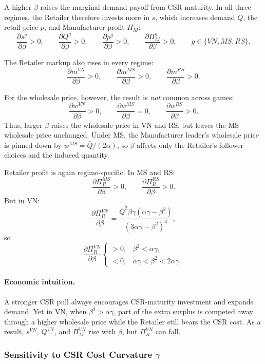 A higher \(\beta\) raises the marginal demand payoff from CSR maturity. In all three regimes,
the Retailer therefore invests more in \(s\), which increases demand \(Q\), the retail price \(p\),
and Manufacturer profit \(\Pi_M\):
\[
\frac{\partial s^g}{\partial\beta}>0,\qquad
\frac{\partial Q^g}{\partial\beta}>0,\qquad
\frac{\partial p^g}{\partial\beta}>0,\qquad
\frac{\partial \Pi_M^g}{\partial\beta}>0,
\qquad g\in\{VN,MS,RS\}.
\]

The Retailer markup also rises in every regime:
\[
\frac{\partial m^{VN}}{\partial\beta}>0,\qquad
\frac{\partial m^{MS}}{\partial\beta}>0,\qquad
\frac{\partial m^{RS}}{\partial\beta}>0.
\]

For the wholesale price, however, the result is \emph{not} common across games:
\[
\frac{\partial w^{VN}}{\partial\beta}>0,\qquad
\frac{\partial w^{MS}}{\partial\beta}=0,\qquad
\frac{\partial w^{RS}}{\partial\beta}>0.
\]
Thus, larger \(\beta\) raises the wholesale price in VN and RS, but leaves the MS wholesale price unchanged. Under MS, the Manufacturer leader's wholesale price is pinned down by \(w^{MS}=\overline Q/(2\alpha)\), so \(\beta\) affects only the Retailer's follower choices and the induced quantity.

Retailer profit is again regime-specific. In MS and RS:
\[
\frac{\partial \Pi_R^{MS}}{\partial\beta}>0,\qquad
\frac{\partial \Pi_R^{RS}}{\partial\beta}>0.
\]
But in VN:
\[
\frac{\partial \Pi_R^{VN}}{\partial\beta}
=
\frac{\overline Q^2\beta\gamma(\alpha\gamma-\beta^2)}{(3\alpha\gamma-\beta^2)^3},
\]
so
\[
\frac{\partial \Pi_R^{VN}}{\partial\beta}
\begin{cases}
>0, & \beta^2<\alpha\gamma,\\
<0, & \alpha\gamma<\beta^2<2\alpha\gamma.
\end{cases}
\]

\paragraph{Economic intuition.}
A stronger CSR pull always encourages CSR-maturity investment and expands demand.
Yet in VN, when \(\beta^2>\alpha\gamma\), part of the extra surplus is competed away through a higher
wholesale price while the Retailer still bears the CSR cost. As a result, \(s^{VN}\), \(Q^{VN}\),
and \(\Pi_M^{VN}\) rise with \(\beta\), but \(\Pi_R^{VN}\) can fall.

\subsubsection{Sensitivity to CSR Cost Curvature \(\gamma\)}

